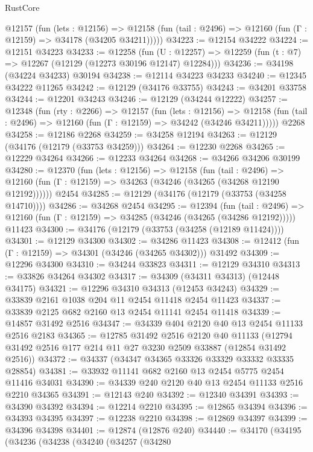 \begin{lexlean}{RustCore}
\begin{coremodule}
    @12157
      (fun (lets : @12156) =>
      @12158 (fun (tail : @2496) => @12160 (fun (Γ : @12159) => @34178 (@34205 @34211)))))
@34223 := @12154 @34222
@34224 := @12151 @34223
@34233 := @12258
    (fun (U : @12257) => @12259 (fun (t : @7) => @12267 (@12129 (@12273 @30196 @12147) @12284)))
@34236 := @34198 (@34224 @34233) @30194
@34238 := @12114 @34223 @34233
@34240 := @12345 @34222 @11265
@34242 := @12129 (@34176 @33755)
@34243 := @34201 @33758
@34244 := @12201 @34243
@34246 := @12129 (@34244 @12222)
@34257 := @12348
    (fun (rty : @2266) =>
    @12157
      (fun (lets : @12156) =>
      @12158 (fun (tail : @2496) => @12160 (fun (Γ : @12159) => @34242 (@34246 @34211)))))
    @2268
@34258 := @12186 @2268
@34259 := @34258 @12194
@34263 := @12129 (@34176 (@12179 (@33753 @34259)))
@34264 := @12230 @2268
@34265 := @12229 @34264
@34266 := @12233 @34264
@34268 := @34266 @34206 @30199
@34280 := @12370
    (fun (lets : @12156) =>
    @12158
      (fun (tail : @2496) =>
      @12160 (fun (Γ : @12159) => @34263 (@34246 (@34265 (@34268 @12190 @12192))))))
    @2454
@34285 := @12129 (@34176 (@12179 (@33753 (@34258 @14710))))
@34286 := @34268 @2454
@34295 := @12394
    (fun (tail : @2496) => @12160 (fun (Γ : @12159) => @34285 (@34246 (@34265 (@34286 @12192)))))
    @11423
@34300 := @34176 (@12179 (@33753 (@34258 (@12189 @11424))))
@34301 := @12129 @34300
@34302 := @34286 @11423
@34308 := @12412 (fun (Γ : @12159) => @34301 (@34246 (@34265 @34302))) @31492
@34309 := @12296 @34300
@34310 := @34244 @33823
@34311 := @12129 @34310
@34313 := @33826 @34264 @34302
@34317 := @34309 (@34311 @34313) (@12448 @34175)
@34321 := @12296 @34310 @34313 (@12453 @34243)
@34329 := @33839 @2161 @1038 @204 @11 @2454 @11418 @2454 @11423
@34337 := @33839 @2125 @682 @2160 @13 @2454 @11141 @2454 @11418
@34339 := @14857 @31492 @2516
@34347 := @34339 @404 @2120 @40 @13 @2454 @11133 @2516 @2183
@34365 := @12785
    @31492
    @2516
    @2120
    @40
    @11133
    (@12794 @31492 @2516 @177 @214 @11 @27 @3230 @2509 @33887 (@12854 @31492 @2516))
@34372 := @34337 (@34347 @34365 @33326 @33329 @33332 @33335 @28854)
@34381 := @33932 @11141 @682 @2160 @13 @2454 @5775 @2454 @11416 @34031
@34390 := @34339 @240 @2120 @40 @13 @2454 @11133 @2516 @2210 @34365
@34391 := @12143 @240
@34392 := @12340 @34391
@34393 := @34390 @34392
@34394 := @12214 @2210
@34395 := @12865 @34394
@34396 := @34393 @34395
@34397 := @12238 @2210
@34398 := @12869 @34397
@34399 := @34396 @34398
@34401 := @12874 (@12876 @240)
@34440 := @34170
    (@34195
      (@34236
        (@34238
          (@34240
            (@34257
              (@34280

\end{coremodule}
\end{lexlean}
